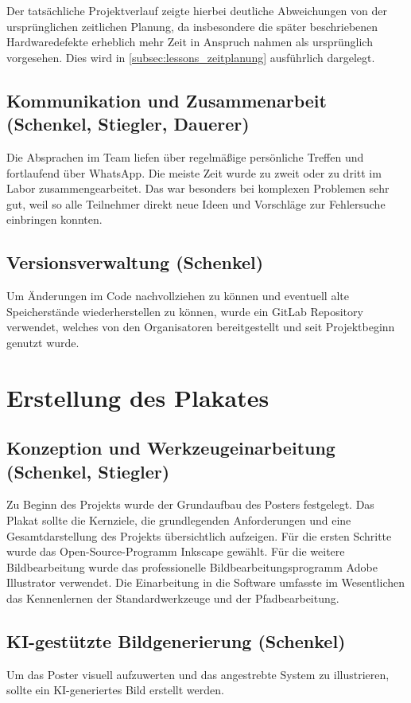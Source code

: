 \documentclass[fontsize=12pt,
parskip=half,	%
department=FakM,  %
logostyle=flat,
twoside, %
DIV=15,BCOR=10mm, %
]{OTHRreprt}
\begin{document}
Der tatsächliche Projektverlauf zeigte hierbei deutliche Abweichungen von der ursprünglichen zeitlichen Planung, da insbesondere die später beschriebenen Hardwaredefekte erheblich mehr Zeit in Anspruch nahmen als ursprünglich vorgesehen. Dies wird in \ref{subsec:lessons_zeitplanung} ausführlich dargelegt.

\subsection{Kommunikation und Zusammenarbeit (Schenkel, Stiegler, Dauerer)}
\label{subsec:kommunikation}
Die Absprachen im Team liefen über regelmäßige persönliche Treffen und fortlaufend über WhatsApp. Die meiste Zeit wurde zu zweit oder zu dritt im Labor zusammengearbeitet. Das war besonders bei komplexen Problemen sehr gut, weil so alle Teilnehmer direkt neue Ideen und Vorschläge zur Fehlersuche einbringen konnten.

\subsection{Versionsverwaltung (Schenkel)}
\label{subsec:versionsverwaltung}
Um Änderungen im Code nachvollziehen zu können und eventuell alte Speicherstände wiederherstellen zu können, wurde ein GitLab Repository verwendet, welches von den Organisatoren bereitgestellt und seit Projektbeginn genutzt wurde. 

\section{Erstellung des Plakates}
\label{sec:plakat}
\subsection{Konzeption und Werkzeugeinarbeitung (Schenkel, Stiegler)}
Zu Beginn des Projekts wurde der Grundaufbau des Posters festgelegt. Das Plakat sollte die Kernziele, die grundlegenden Anforderungen und eine Gesamtdarstellung des Projekts übersichtlich aufzeigen. Für die ersten Schritte wurde das Open-Source-Programm Inkscape gewählt. Für die weitere Bildbearbeitung wurde das professionelle Bildbearbeitungsprogramm Adobe Illustrator verwendet. Die Einarbeitung in die Software umfasste im Wesentlichen das Kennenlernen der Standardwerkzeuge und der Pfadbearbeitung. 

\subsection{KI-gestützte Bildgenerierung (Schenkel)}
Um das Poster visuell aufzuwerten und das angestrebte System zu illustrieren, sollte ein KI-generiertes Bild erstellt werden.
\end{document}
